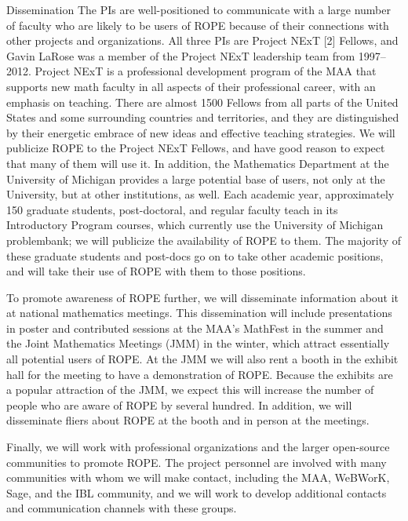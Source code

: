 \documentclass[11pt]{article}
\begin{document}
\begin{section}{Dissemination}
The PIs are well-positioned to communicate
with a large number of faculty who are likely to be users of ROPE
because of their connections with other projects and organizations.  All
three PIs are Project NExT [2]
Fellows, and Gavin LaRose was a member of the Project NExT leadership team
from 1997--2012.
Project NExT is a professional development program of the MAA that
supports new math faculty in all aspects of their professional career,
with an emphasis on teaching.  There are almost 1500 Fellows from all parts
of the United States and some surrounding countries and territories, and
they are distinguished by their energetic embrace of new ideas and
effective teaching strategies.  We will publicize ROPE to the Project
NExT Fellows, and have good reason to expect that many of them will use
it.  In addition, the Mathematics Department at 
the University of Michigan provides a large potential base of users, not
only at the University, but at other institutions, as well.  Each academic
year, approximately 150 graduate students, post-doctoral, and regular
faculty teach in its Introductory Program courses, which currently use the
University of Michigan problembank; we will publicize
the availability of ROPE to them.  The majority of these graduate
students and post-docs go on to take other academic positions, and will
take their use of ROPE with them to those positions.

To promote awareness of ROPE further, we will disseminate
information about it at national mathematics meetings.  This
dissemination will include presentations in poster and contributed
sessions at the MAA's MathFest in the summer and the Joint Mathematics
Meetings (JMM) in the winter, which attract essentially all potential
users of ROPE.  At the JMM we will also rent a booth in the exhibit hall
for the meeting to have a demonstration of ROPE.  Because the exhibits
are a popular attraction of the JMM, we expect this will increase the
number of people who are aware of ROPE by several hundred.  In
addition, we will disseminate fliers about ROPE at the booth and in
person at the meetings.

Finally, we will work with professional organizations and the larger
open-source communities to promote ROPE.  The project personnel are
involved with many communities with whom we will make contact, including
the MAA, WeBWorK, Sage, and the IBL community, and we will work to develop additional contacts
and communication channels with these groups.

\end{section}
\end{document}

